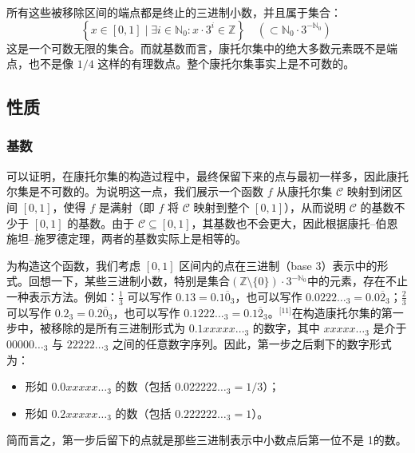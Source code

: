 所有这些被移除区间的端点都是终止的三进制小数，并且属于集合：
$$
\left\{ x \in [0,1] \mid \exists i \in \mathbb{N}_0: x \cdot 3^i \in \mathbb{Z} \right\} \quad \left( \subset \mathbb{N}_0 \cdot 3^{-\mathbb{N}_0} \right)~
$$
这是一个可数无限的集合。而就基数而言，康托尔集中的绝大多数元素既不是端点，也不是像 $1/4$ 这样的有理数点。整个康托尔集事实上是不可数的。
\subsection{性质}
\subsubsection{基数}
可以证明，在康托尔集的构造过程中，最终保留下来的点与最初一样多，因此康托尔集是不可数的。为说明这一点，我们展示一个函数 $f$ 从康托尔集 $\mathcal{C}$ 映射到闭区间 $[0,1]$，使得 $f$ 是满射（即 $f$ 将 $\mathcal{C}$ 映射到整个 $[0,1]$），从而说明 $\mathcal{C}$ 的基数不少于 $[0,1]$ 的基数。由于 $\mathcal{C} \subseteq [0,1]$，其基数也不会更大，因此根据康托–伯恩施坦–施罗德定理，两者的基数实际上是相等的。

为构造这个函数，我们考虑 $[0,1]$ 区间内的点在三进制（base 3）表示中的形式。回想一下，某些三进制小数，特别是集合$\left( \mathbb{Z} \setminus \{0\} \right) \cdot 3^{-\mathbb{N}_0}$中的元素，存在不止一种表示方法。例如：$\frac{1}{3}$ 可以写作 $0.13 = 0.1\overline{0}_3$，也可以写作 $0.0222\ldots_3 = 0.0\overline{2}_3$；$\frac{2}{3}$ 可以写作 $0.2_3 = 0.2\overline{0}_3$，也可以写作 $0.1222\ldots_3 = 0.1\overline{2}_3$。\(^\text{[11]}\)在构造康托尔集的第一步中，被移除的是所有三进制形式为 $0.1xxxxx\ldots_3$ 的数字，其中 $xxxxx\ldots_3$ 是介于 $00000\ldots_3$ 与 $22222\ldots_3$ 之间的任意数字序列。因此，第一步之后剩下的数字形式为：
\begin{itemize}
\item 形如 $0.0xxxxx\ldots_3$ 的数（包括 $0.022222\ldots_3 = 1/3$）；
\item 形如 $0.2xxxxx\ldots_3$ 的数（包括 $0.222222\ldots_3 = 1$）。
\end{itemize}
简而言之，第一步后留下的点就是那些三进制表示中小数点后第一位不是 1的数。


